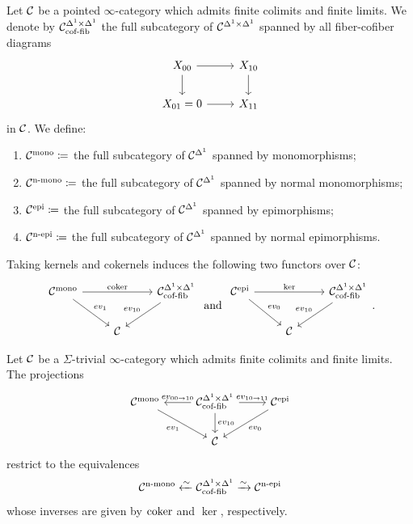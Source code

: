 \documentclass[10pt,a4paper,oneside]{article}
\begin{document}
\begin{de}\label{def:c-s-mono-epi}
Let $\mathcal{C}$ be a pointed $\infty$-category which admits finite colimits and finite limits. We denote by $\mathcal{C}^{\Delta^1\times\Delta^1}_{\operatorname{cof-fib}}$ the full subcategory of $\mathcal{C}^{\Delta^1\times\Delta^1}$ spanned by all fiber-cofiber diagrams
$$
\begin{tikzcd}
X_{00} \arrow[d] \arrow[r] & X_{10} \arrow[d] \\
X_{01}=0 \arrow[r]           & X_{11}        
\end{tikzcd}
$$in $\mathcal{C}$. We define:
\begin{enumerate}
\item $\mathcal{C}^{\operatorname{mono}}\coloneqq$ the full subcategory of $\mathcal{C}^{\Delta^1}$ spanned by monomorphisms;
\item $\mathcal{C}^{\operatorname{n-mono}}\coloneqq$ the full subcategory of $\mathcal{C}^{\Delta^1}$ spanned by normal monomorphisms;
\item $\mathcal{C}^{\operatorname{epi}}\coloneqq$ the full subcategory of $\mathcal{C}^{\Delta^1}$ spanned by epimorphisms;
\item $\mathcal{C}^{\operatorname{n-epi}}\coloneqq$ the full subcategory of $\mathcal{C}^{\Delta^1}$ spanned by normal epimorphisms.
\end{enumerate}
Taking kernels and cokernels induces the following two functors over $\mathcal{C}$:
$$%
\begin{tikzcd}
\mcc^{\op{mono}} \arrow[rr, "\coker"] \arrow[rd, "ev_1"] &      & \mcc^{\Delta^1\times\Delta^1}_{\op{cof-fib}} \arrow[ld, "ev_{10}"'] \\
& \mcc &                                                                    
\end{tikzcd}
\text{  and  }
\begin{tikzcd}
\mcc^{\op{epi}} \arrow[rr, "\ker"] \arrow[rd, "ev_0"] &      & \mcc^{\Delta^1\times\Delta^1}_{\op{cof-fib}} \arrow[ld, "ev_{10}"'] \\
& \mcc &                                                                    
\end{tikzcd}.$$
\end{de}

\begin{prop}\label{prop:c-s-mono-epi}
Let $\mathcal{C}$ be a $\Sigma$-trivial  $\infty$-category which admits finite colimits and finite limits. The projections  
$$
\begin{tikzcd}
\mcc^{\op{mono}} \arrow[rd, "ev_1"'] & \mcc^{\Delta^1\times\Delta^1}_{\op{cof-fib}} \arrow[l, "ev_{00\to10}"'] \arrow[r, "ev_{10\to11}"] \arrow[d, "ev_{10}"] & \mcc^{\op{epi}} \arrow[ld, "ev_0"] \\
& \mcc                                                                                                                   &                                   
\end{tikzcd}
$$
restrict to the equivalences
$$
\mathcal{C}^{\operatorname{n-mono}}\xleftarrow{\sim}\mathcal{C}^{\Delta^1\times\Delta^1}_{\operatorname{cof-fib}}\xrightarrow{\sim}\mathcal{C}^{\operatorname{n-epi}}
$$
whose inverses are given by $\operatorname{coker}$ and $\ker$, respectively.
\end{prop}
\end{document}
